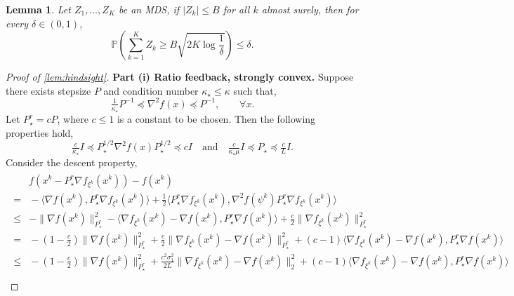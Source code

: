 \documentclass[10pt,a4paper]{amsart}
\newtheorem{lemma}{Lemma}
\begin{document}
\begin{lemma}
  \label{lem:azuma}
  Let $Z_1, \ldots, Z_K$ be an MDS, if $| Z_k | \leq B$ for
  all $k$ almost surely, then for every $\delta \in (0, 1)$,
  \[ \mathbb{P} \left( \textstyle \sum_{k = 1}^K Z_k \geq B \sqrt{2 K \log \frac{1}{\delta}}
     \right) \leq \delta . \]
\end{lemma}

\begin{proof}[Proof of \cref{lem:hindsight}]
  \textbf{Part (i) Ratio feedback, strongly convex.} Suppose there exists stepsize $P$ and condition number
  $\kappa_{\star} \leq \kappa$ such that,
  \[ \tfrac{1}{\kappa_{\star}} P^{- 1} \preceq \nabla^2 f (x) \preceq P^{- 1},
     \qquad \forall x. \]
  Let $P^r_{\star} = c P$, where $c \leq 1$ is a constant to be chosen. Then
  the following properties hold,
  \begin{equation}
    \tfrac{c}{\kappa_{\star}} I \preceq P_{\star}^{1 / 2} \nabla^2 f (x)
    P_{\star}^{1 / 2} \preceq c I \quad \text{and} \quad
    \tfrac{c}{\kappa_{\star} \mu} I \preceq P_{\star} \preceq \tfrac{c}{L} I.
    \label{eq:P-star-bound}
  \end{equation}
  Consider the descent property,
  \begin{align}
    \begin{split}\label{eq:hindsight-1} 
      &{} f (x^k - P^r_{\star} \nabla f_{\xi^k} (x^k)) - f (x^k) \\
    =&{} - \langle \nabla f (x^k), P^r_{\star} \nabla f_{\xi^k} (x^k)
    \rangle + \tfrac{1}{2} \langle P^r_{\star} \nabla f_{\xi^k} (x^k),
    \nabla^2 f (\psi^k) P^r_{\star} \nabla f_{\xi^k} (x^k) \rangle \\
    \leq &{} - \| \nabla f (x^k) \|_{P^r_{\star}}^2 - \langle \nabla
    f_{\xi^k} (x^k) - \nabla f (x^k), P^r_{\star} \nabla f (x^k) \rangle +
    \tfrac{c}{2} \| \nabla f_{\xi^k} (x^k) \|_{P^r_{\star}}^2 \\
    = &{} - \left( 1 - \tfrac{c}{2} \right) \| \nabla f (x^k)
    \|_{P^r_{\star}}^2 + \tfrac{c}{2} \| \nabla f_{\xi^k} (x^k) - \nabla f
    (x^k) \|_{P^r_{\star}}^2 + (c - 1) \langle \nabla f_{\xi^k} (x^k) - \nabla
    f (x^k), P^r_{\star} \nabla f (x^k) \rangle \\
    \leq &{} - \left( 1 - \tfrac{c}{2} \right) \| \nabla f (x^k)
    \|_{P^r_{\star}}^2 + \tfrac{c^2 \sigma_1^2}{2 L} \| \nabla f_{\xi^k} (x^k)
    - \nabla f (x^k) \|_2^2 + (c - 1) \langle \nabla f_{\xi^k} (x^k) - \nabla
    f (x^k), P^r_{\star} \nabla f (x^k) \rangle \\

\end{split}
\end{align}
\end{proof}
\end{document}
